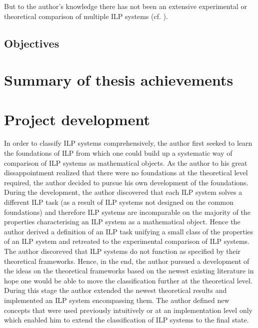 But to the author's knowledge there has not been an extensive experimental or theoretical comparison of multiple ILP systems (cf. ). 

\subsection{Objectives}

\section{Summary of thesis achievements}

\section{Project development}
In order to classify ILP systems comprehensively, the author first seeked to learn the foundations of ILP from which one could build up a systematic way of comparison of ILP systems as mathematical objects. As the author to his great dissappointment realized that there were no foundations at the theoretical level required, the author decided to pursue his own development of the foundations. During the development, the author discovered that each ILP system solves a different ILP task (as a result of ILP systems not designed on the common foundations) and therefore ILP systems are incomparable on the majority of the properties characterising an ILP system as a mathematical object. Hence the author derived a definition of an ILP task unifying a small class of the properties of an ILP system and retreated to the experimental comparison of ILP systems. The author discoreved that ILP systems do not function as specified by their theoretical frameworks. Hence, in the end, the author pursued a development of the ideas on the theoretical frameworks based on the newest existing literature in hope one would be able to move the classification further at the theoretical level. During this stage the author extended the newest theoretical results and implemented an ILP system encompassing them. The author defined new concepts that were used previously intuitively or at an implementation level only which enabled him to extend the classification of ILP systems to the final state.

